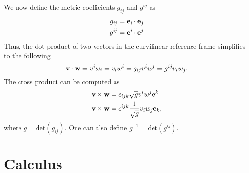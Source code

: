 \documentclass[11pt]{article}
\begin{document}
We now define the metric coefficients $g_{ij}$ and $g^{ij}$ as
\begin{align}
    g_{ij} &= \mathbf{e}_i \cdot \mathbf{e}_j \\
    g^{ij} &= \mathbf{e}^i \cdot \mathbf{e}^j \\
\end{align}
Thus, the dot product of two vectors in the curvilinear reference frame simplifies to the following
\begin{equation}
\mathbf{v} \cdot \mathbf{w} = v^i w_i = v_i w^i = g_{ij} v^i w^j = g^{ij} v_i w_j.
\end{equation}
The cross product can be computed as
\begin{align}
    \mathbf{v} \times \mathbf{w} &= \epsilon_{ijk} \sqrt{g} v^i w^j \mathbf{e}^k \\
    \mathbf{v} \times \mathbf{w} &= \epsilon^{ijk} \frac{1}{\sqrt{g}} v_i w_j \mathbf{e}_k,
\end{align}
where $g = \text{det}(g_{ij})$. One can also define $g^{-1} = \text{det}(g^{ij})$.

\section{Calculus}
\end{document}
